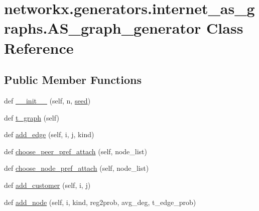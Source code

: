 \hypertarget{classnetworkx_1_1generators_1_1internet__as__graphs_1_1AS__graph__generator}{}\section{networkx.\+generators.\+internet\+\_\+as\+\_\+graphs.\+A\+S\+\_\+graph\+\_\+generator Class Reference}
\label{classnetworkx_1_1generators_1_1internet__as__graphs_1_1AS__graph__generator}
\subsection*{Public Member Functions}
\begin{DoxyCompactItemize}
\item 
def \hyperlink{classnetworkx_1_1generators_1_1internet__as__graphs_1_1AS__graph__generator_a5f6c3b8bf8473ff489f32f144e42746b}{\+\_\+\+\_\+init\+\_\+\+\_\+} (self, n, \hyperlink{classnetworkx_1_1generators_1_1internet__as__graphs_1_1AS__graph__generator_a615d9aa5b960bd8c17a2241471ca6c00}{seed})
\item 
def \hyperlink{classnetworkx_1_1generators_1_1internet__as__graphs_1_1AS__graph__generator_a240ffbe539bca725d6eed89d08e28b75}{t\+\_\+graph} (self)
\item 
def \hyperlink{classnetworkx_1_1generators_1_1internet__as__graphs_1_1AS__graph__generator_a092527fd5bec645f71736506882e8e93}{add\+\_\+edge} (self, i, j, kind)
\item 
def \hyperlink{classnetworkx_1_1generators_1_1internet__as__graphs_1_1AS__graph__generator_a3aaae7a61d07306ae4bd050e646e27dd}{choose\+\_\+peer\+\_\+pref\+\_\+attach} (self, node\+\_\+list)
\item 
def \hyperlink{classnetworkx_1_1generators_1_1internet__as__graphs_1_1AS__graph__generator_a2dc9150cd108d2be3a61c5bb5f95f84b}{choose\+\_\+node\+\_\+pref\+\_\+attach} (self, node\+\_\+list)
\item 
def \hyperlink{classnetworkx_1_1generators_1_1internet__as__graphs_1_1AS__graph__generator_a99993eec93e24a6b8cc6e2bf3dd9fed8}{add\+\_\+customer} (self, i, j)
\item 
def \hyperlink{classnetworkx_1_1generators_1_1internet__as__graphs_1_1AS__graph__generator_aad14e5ad20f531a4a28655911dc98902}{add\+\_\+node} (self, i, kind, reg2prob, avg\+\_\+deg, t\+\_\+edge\+\_\+prob)
\item 

\end{DoxyCompactItemize}
